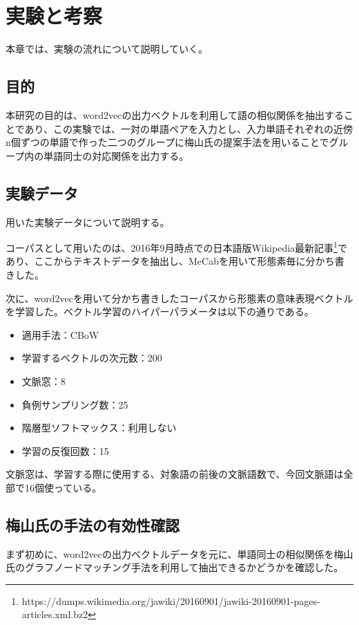 \chapter{実験と考察}
本章では、実験の流れについて説明していく。

\section{目的}
本研究の目的は、word2vecの出力ベクトルを利用して語の相似関係を抽出することであり、この実験では、一対の単語ペアを入力とし、入力単語それぞれの近傍n個ずつの単語で作った二つのグループに梅山氏の提案手法を用いることでグループ内の単語同士の対応関係を出力する。

\section{実験データ}
用いた実験データについて説明する。

コーパスとして用いたのは、2016年9月時点での日本語版Wikipedia最新記事\footnote{https://dumps.wikimedia.org/jawiki/20160901/jawiki-20160901-pages-articles.xml.bz2}であり、ここからテキストデータを抽出し、MeCabを用いて形態素毎に分かち書きした。

次に、word2vecを用いて分かち書きしたコーパスから形態素の意味表現ベクトルを学習した。ベクトル学習のハイパーパラメータは以下の通りである。
\begin{itemize}
  \item 適用手法：CBoW
  \item 学習するベクトルの次元数：200
  \item 文脈窓：8
  \item 負例サンプリング数：25
  \item 階層型ソフトマックス：利用しない
  \item 学習の反復回数：15
\end{itemize}
文脈窓は、学習する際に使用する、対象語の前後の文脈語数で、今回文脈語は全部で16個使っている。

\section{梅山氏の手法の有効性確認}
\label{ume_yq}
まず初めに、word2vecの出力ベクトルデータを元に、単語同士の相似関係を梅山氏のグラフノードマッチング手法を利用して抽出できるかどうかを確認した。

